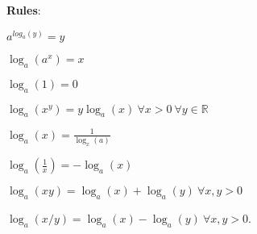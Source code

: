 {\bf Rules}:
	
	$a^{log_a(y)}=y $
	
	$\log_a(a^x)=x$
	
	$\log_a(1)=0$
	
	$\log_a(x^y)=y\log_a(x) \ \forall x>0 \ \forall y \in \mathbb{R}$
	
	$\log_a(x)=\frac{1}{\log_x(a)}$
	
	$\log_a(\frac{1}{x})=-\log_a(x)$
	
	$\log_a(xy) = \log_a(x)+\log_a(y) \  \forall x,y>0$
	
	$\log_a(x/y) = \log_a(x)-\log_a(y) \ \forall x,y>0$.
